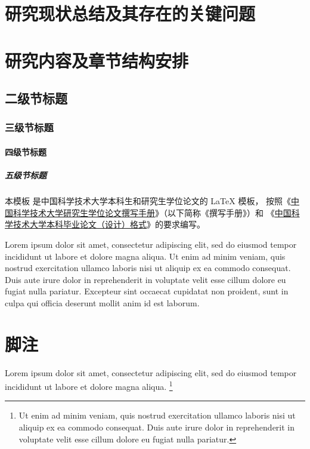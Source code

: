 \section{研究现状总结及其存在的关键问题}

\section{研究内容及章节结构安排}

\subsection{二级节标题}

\subsubsection{三级节标题}

\paragraph{四级节标题}

\subparagraph{五级节标题}

本模板  是中国科学技术大学本科生和研究生学位论文的 \LaTeX{}
模板， 按照《\href{https://gradschool.ustc.edu.cn/static/upload/article/picture/ce3b02e5f0274c90b9331ef50ae1ac26.pdf}
{中国科学技术大学研究生学位论文撰写手册}》（以下简称《撰写手册》）和
《\href{https://www.teach.ustc.edu.cn/?attachment_id=13867}
{中国科学技术大学本科毕业论文（设计）格式}》的要求编写。

Lorem ipsum dolor sit amet, consectetur adipiscing elit, sed do eiusmod tempor
incididunt ut labore et dolore magna aliqua.
Ut enim ad minim veniam, quis nostrud exercitation ullamco laboris nisi ut
aliquip ex ea commodo consequat.
Duis aute irure dolor in reprehenderit in voluptate velit esse cillum dolore eu
fugiat nulla pariatur.
Excepteur sint occaecat cupidatat non proident, sunt in culpa qui officia
deserunt mollit anim id est laborum.



\section{脚注}

Lorem ipsum dolor sit amet, consectetur adipiscing elit, sed do eiusmod tempor
incididunt ut labore et dolore magna aliqua.
\footnote{Ut enim ad minim veniam, quis nostrud exercitation ullamco laboris
  nisi ut aliquip ex ea commodo consequat.
  Duis aute irure dolor in reprehenderit in voluptate velit esse cillum dolore
  eu fugiat nulla pariatur.}
